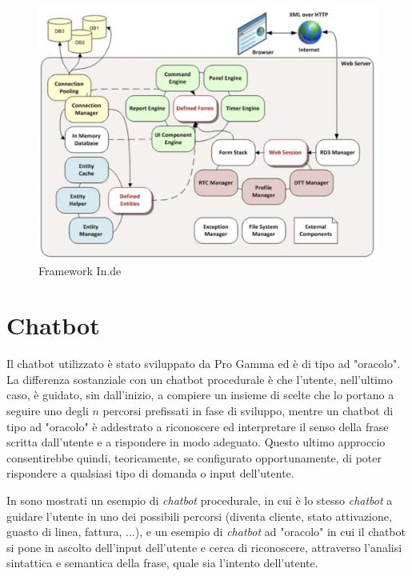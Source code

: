 \begin{figure}
    \centering{}
    \includegraphics*[width=\textwidth]{./img/framework-inde.png}
    \caption{Framework In.de}
    \label{fig:framework}
\end{figure}

\section{Chatbot}
Il chatbot utilizzato è stato sviluppato da Pro Gamma ed è di tipo ad "oracolo".
%
La differenza sostanziale con un chatbot procedurale è che l'utente, nell'ultimo caso, è guidato, sin dall'inizio, a compiere un insieme di scelte che lo portano a seguire uno degli $n$ percorsi prefissati in fase di sviluppo, mentre un chatbot di tipo ad "oracolo" è addestrato a riconoscere ed interpretare il senso della frase scritta dall'utente e a rispondere in modo adeguato.
%
Questo ultimo approccio consentirebbe quindi, teoricamente, se configurato opportunamente, di poter rispondere a qualsiasi tipo di domanda o input dell'utente.

In  sono mostrati un esempio di \textit{chatbot} procedurale, in cui è lo stesso \textit{chatbot} a guidare l'utente in uno dei possibili percorsi (diventa cliente, stato attivazione, guasto di linea, fattura, ...), e un esempio di \textit{chatbot} ad "oracolo" in cui il chatbot si pone in ascolto dell'input dell'utente e cerca di riconoscere, attraverso l'analisi sintattica e semantica della frase, quale sia l'intento dell'utente.

